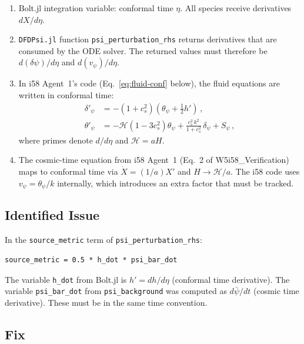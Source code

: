 \documentclass[11pt,a4paper]{article}
\begin{document}
\begin{enumerate}
\item Bolt.jl integration variable: conformal time $\eta$. All species receive derivatives $dX/d\eta$.

\item \texttt{DFDPsi.jl} function \texttt{psi\_perturbation\_rhs} returns derivatives that are consumed by the ODE solver. The returned values must therefore be $d(\delta\psi)/d\eta$ and $d(v_\psi)/d\eta$.

\item In i58 Agent~1's code (Eq.~\ref{eq:fluid-conf} below), the fluid equations are written in conformal time:
\begin{align}
\label{eq:fluid-conf}
\delta'_\psi &= -(1+c_s^2)\left(\theta_\psi + \tfrac{1}{2}h'\right)\,, \\
\theta'_\psi &= -\mathcal{H}(1-3c_s^2)\theta_\psi + \frac{c_s^2\,k^2}{1+c_s^2}\,\delta_\psi + S_\psi\,,
\end{align}
where primes denote $d/d\eta$ and $\mathcal{H} = aH$.

\item The cosmic-time equation from i58 Agent~1 (Eq.~2 of W5i58\_Verification) maps to conformal time via $\dot{X} = (1/a)X'$ and $H \to \mathcal{H}/a$. The i58 code uses $v_\psi = \theta_\psi/k$ internally, which introduces an extra factor that must be tracked.
\end{enumerate}

\subsection{Identified Issue}

In the \texttt{source\_metric} term of \texttt{psi\_perturbation\_rhs}:
\begin{lstlisting}[caption={Original i58 code, line 202}]
source_metric = 0.5 * h_dot * psi_bar_dot
\end{lstlisting}

The variable \texttt{h\_dot} from Bolt.jl is $h' = dh/d\eta$ (conformal time derivative). The variable \texttt{psi\_bar\_dot} from \texttt{psi\_background} was computed as $d\bar\psi/dt$ (cosmic time derivative). These must be in the same time convention.

\subsection{Fix}
\end{document}
